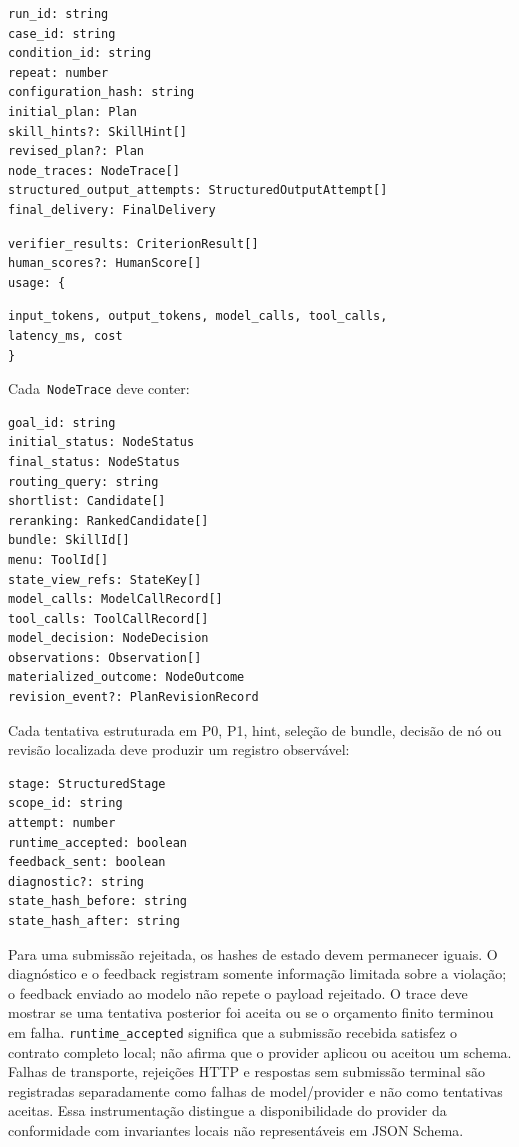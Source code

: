 \documentclass[12pt,a4paper]{article}
\begin{document}


\begin{Verbatim}[breaklines=true,breakanywhere=true,fontsize=\small]
run_id: string
case_id: string
condition_id: string
repeat: number
configuration_hash: string
initial_plan: Plan
skill_hints?: SkillHint[]
revised_plan?: Plan
node_traces: NodeTrace[]
structured_output_attempts: StructuredOutputAttempt[]
final_delivery: FinalDelivery
\end{Verbatim}


\begin{Verbatim}[breaklines=true,breakanywhere=true,fontsize=\small]
verifier_results: CriterionResult[]
human_scores?: HumanScore[]
usage: {
\end{Verbatim}

\begin{Verbatim}[breaklines=true,breakanywhere=true,fontsize=\small]
input_tokens, output_tokens, model_calls, tool_calls,
latency_ms, cost
}
\end{Verbatim}

Cada\texttt{ NodeTrace} deve conter:


\begin{Verbatim}[breaklines=true,breakanywhere=true,fontsize=\small]
goal_id: string
initial_status: NodeStatus
final_status: NodeStatus
routing_query: string
shortlist: Candidate[]
reranking: RankedCandidate[]
bundle: SkillId[]
menu: ToolId[]
state_view_refs: StateKey[]
model_calls: ModelCallRecord[]
tool_calls: ToolCallRecord[]
model_decision: NodeDecision
observations: Observation[]
materialized_outcome: NodeOutcome
revision_event?: PlanRevisionRecord
\end{Verbatim}

Cada tentativa estruturada em P0, P1, hint, seleção de bundle, decisão de nó ou revisão localizada deve produzir um registro observável:


\begin{Verbatim}[breaklines=true,breakanywhere=true,fontsize=\small]
stage: StructuredStage
scope_id: string
attempt: number
runtime_accepted: boolean
feedback_sent: boolean
diagnostic?: string
state_hash_before: string
state_hash_after: string
\end{Verbatim}

Para uma submissão rejeitada, os hashes de estado devem permanecer iguais. O diagnóstico e o feedback registram somente informação limitada sobre a violação; o feedback enviado ao modelo não repete o payload rejeitado. O trace deve mostrar se uma tentativa posterior foi aceita ou se o orçamento finito terminou em falha. \texttt{runtime\_accepted} significa que a submissão recebida satisfez o contrato completo local; não afirma que o provider aplicou ou aceitou um schema. Falhas de transporte, rejeições HTTP e respostas sem submissão terminal são registradas separadamente como falhas de model/provider e não como tentativas aceitas. Essa instrumentação distingue a disponibilidade do provider da conformidade com invariantes locais não representáveis em JSON Schema.
\end{document}
